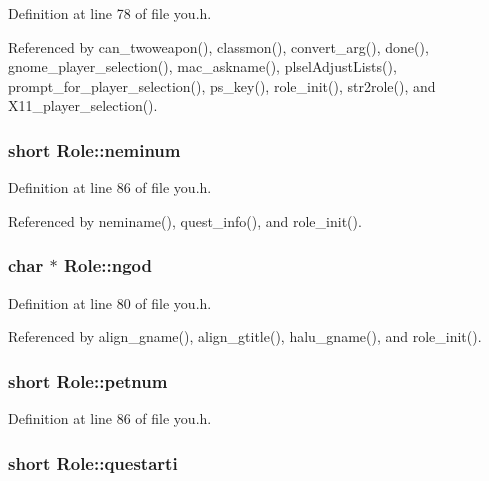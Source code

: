 Definition at line 78 of file you.\+h.



Referenced by can\+\_\+twoweapon(), classmon(), convert\+\_\+arg(), done(), gnome\+\_\+player\+\_\+selection(), mac\+\_\+askname(), plsel\+Adjust\+Lists(), prompt\+\_\+for\+\_\+player\+\_\+selection(), ps\+\_\+key(), role\+\_\+init(), str2role(), and X11\+\_\+player\+\_\+selection().

\hypertarget{structRole_aec68a6097bd49a6e67141282f92ad09c}{
\subsubsection[{neminum}]{\setlength{\rightskip}{0pt plus 5cm}short Role\+::neminum}}\label{structRole_aec68a6097bd49a6e67141282f92ad09c}


Definition at line 86 of file you.\+h.



Referenced by neminame(), quest\+\_\+info(), and role\+\_\+init().

\hypertarget{structRole_aa4c0b03524de8f7c7efcaa301b8badbb}{
\subsubsection[{ngod}]{ char $\ast$ Role\+::ngod}}\label{structRole_aa4c0b03524de8f7c7efcaa301b8badbb}


Definition at line 80 of file you.\+h.



Referenced by align\+\_\+gname(), align\+\_\+gtitle(), halu\+\_\+gname(), and role\+\_\+init().

\hypertarget{structRole_a86f1281a23bc3c6041ace438855bbb8d}{
\subsubsection[{petnum}]{\setlength{\rightskip}{0pt plus 5cm}short Role\+::petnum}}\label{structRole_a86f1281a23bc3c6041ace438855bbb8d}


Definition at line 86 of file you.\+h.

\hypertarget{structRole_af3333d55b15fae9edb56c414ecc9ccf3}{
\subsubsection[{questarti}]{\setlength{\rightskip}{0pt plus 5cm}short Role\+::questarti}}\label{structRole_af3333d55b15fae9edb56c414ecc9ccf3}


